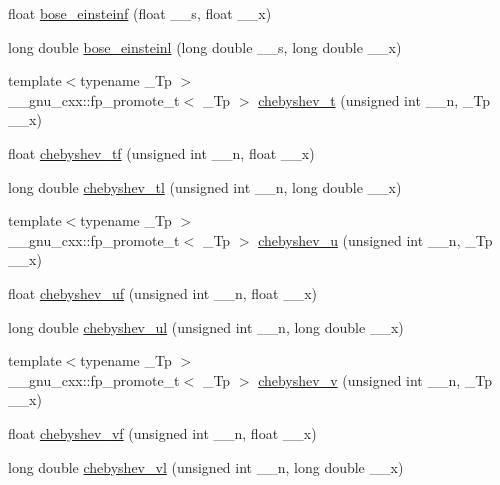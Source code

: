 \begin{DoxyCompactItemize}
\item 
float \hyperlink{group__mathsf__gnu_gac1fb313fba5639d4168b6ee682507688}{bose\+\_\+einsteinf} (float \+\_\+\+\_\+s, float \+\_\+\+\_\+x)
\item 
long double \hyperlink{group__mathsf__gnu_ga995c3ff580f81afb139f9cd50f445b48}{bose\+\_\+einsteinl} (long double \+\_\+\+\_\+s, long double \+\_\+\+\_\+x)
\item 
{\footnotesize template$<$typename \+\_\+\+Tp $>$ }\\\+\_\+\+\_\+gnu\+\_\+cxx\+::fp\+\_\+promote\+\_\+t$<$ \+\_\+\+Tp $>$ \hyperlink{group__mathsf__gnu_ga4d9cae9de13a64ceeb4fb0226f4b7844}{chebyshev\+\_\+t} (unsigned int \+\_\+\+\_\+n, \+\_\+\+Tp \+\_\+\+\_\+x)
\item 
float \hyperlink{group__mathsf__gnu_gab8cdb55702d9c8b85af4ecc3d8c6a134}{chebyshev\+\_\+tf} (unsigned int \+\_\+\+\_\+n, float \+\_\+\+\_\+x)
\item 
long double \hyperlink{group__mathsf__gnu_ga0c421700d244cdf58e3ac5ff267664d1}{chebyshev\+\_\+tl} (unsigned int \+\_\+\+\_\+n, long double \+\_\+\+\_\+x)
\item 
{\footnotesize template$<$typename \+\_\+\+Tp $>$ }\\\+\_\+\+\_\+gnu\+\_\+cxx\+::fp\+\_\+promote\+\_\+t$<$ \+\_\+\+Tp $>$ \hyperlink{group__mathsf__gnu_gafa90c06bdedb8459f20576297cf1608f}{chebyshev\+\_\+u} (unsigned int \+\_\+\+\_\+n, \+\_\+\+Tp \+\_\+\+\_\+x)
\item 
float \hyperlink{group__mathsf__gnu_ga4b28c2a079eae2e9612c9902801ca256}{chebyshev\+\_\+uf} (unsigned int \+\_\+\+\_\+n, float \+\_\+\+\_\+x)
\item 
long double \hyperlink{group__mathsf__gnu_ga11ec202d6aacafba1182e962ecf02978}{chebyshev\+\_\+ul} (unsigned int \+\_\+\+\_\+n, long double \+\_\+\+\_\+x)
\item 
{\footnotesize template$<$typename \+\_\+\+Tp $>$ }\\\+\_\+\+\_\+gnu\+\_\+cxx\+::fp\+\_\+promote\+\_\+t$<$ \+\_\+\+Tp $>$ \hyperlink{group__mathsf__gnu_ga32b7decd0002f542d2c9187c5f0846c6}{chebyshev\+\_\+v} (unsigned int \+\_\+\+\_\+n, \+\_\+\+Tp \+\_\+\+\_\+x)
\item 
float \hyperlink{group__mathsf__gnu_gaa9635a0da4bdeaa8060ae5cf03c3a12d}{chebyshev\+\_\+vf} (unsigned int \+\_\+\+\_\+n, float \+\_\+\+\_\+x)
\item 
long double \hyperlink{group__mathsf__gnu_gae387ee1bfcd52555ad4d690f5888a078}{chebyshev\+\_\+vl} (unsigned int \+\_\+\+\_\+n, long double \+\_\+\+\_\+x)
\item 

\end{DoxyCompactItemize}
